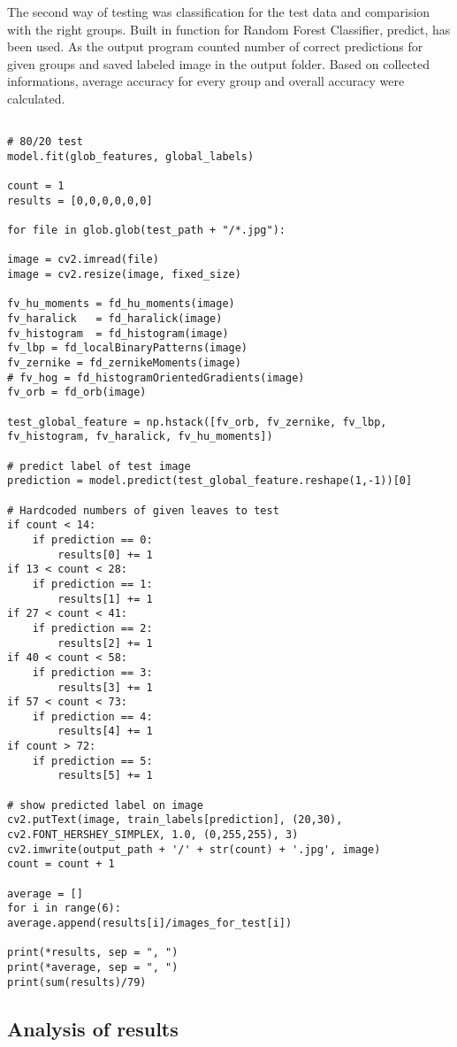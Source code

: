 \documentclass{article}
\begin{document}
The second way of testing was classification for the test data and comparision with the right groups. Built in function for Random Forest Classifier, predict, has been used. As the output program counted number of correct predictions for given groups and saved labeled image in the output folder. Based on collected informations, average accuracy for every group and overall accuracy were calculated.

\begin{verbatim}

# 80/20 test
model.fit(glob_features, global_labels)

count = 1
results = [0,0,0,0,0,0]

for file in glob.glob(test_path + "/*.jpg"):

image = cv2.imread(file)   
image = cv2.resize(image, fixed_size)

fv_hu_moments = fd_hu_moments(image)
fv_haralick   = fd_haralick(image)
fv_histogram  = fd_histogram(image)
fv_lbp = fd_localBinaryPatterns(image)
fv_zernike = fd_zernikeMoments(image)
# fv_hog = fd_histogramOrientedGradients(image) 
fv_orb = fd_orb(image)

test_global_feature = np.hstack([fv_orb, fv_zernike, fv_lbp, fv_histogram, fv_haralick, fv_hu_moments])

# predict label of test image
prediction = model.predict(test_global_feature.reshape(1,-1))[0]

# Hardcoded numbers of given leaves to test
if count < 14:
	if prediction == 0:
		results[0] += 1
if 13 < count < 28:
	if prediction == 1:
		results[1] += 1
if 27 < count < 41:
	if prediction == 2:
		results[2] += 1
if 40 < count < 58:
	if prediction == 3:
		results[3] += 1
if 57 < count < 73:
	if prediction == 4:
		results[4] += 1
if count > 72:
	if prediction == 5:
		results[5] += 1

# show predicted label on image
cv2.putText(image, train_labels[prediction], (20,30), cv2.FONT_HERSHEY_SIMPLEX, 1.0, (0,255,255), 3)
cv2.imwrite(output_path + '/' + str(count) + '.jpg', image)
count = count + 1

average = []
for i in range(6):
average.append(results[i]/images_for_test[i])

print(*results, sep = ", ")
print(*average, sep = ", ")
print(sum(results)/79)

\end{verbatim}

\subsection{Analysis of results}
\end{document}
